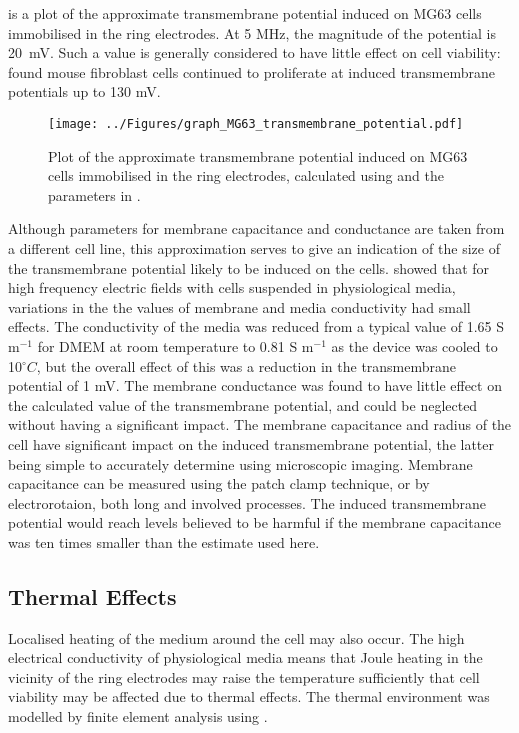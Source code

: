  is a plot of the approximate transmembrane potential induced on MG63 cells immobilised in the ring electrodes. At 5 MHz, the magnitude of the potential is 20~mV. Such a value is generally considered to have little effect on cell viability: \cite{Glasser:1998} found mouse fibroblast cells continued to proliferate at induced transmembrane potentials up to 130 mV.

\begin{figure}
	\centering
		\texttt{[image: ../Figures/graph\_MG63\_transmembrane\_potential.pdf]}
	\caption[Plot of the approximate transmembrane potential induced on MG63 cells immobilised in the ring electrodes.]{Plot of the approximate transmembrane potential induced on MG63 cells immobilised in the ring electrodes, calculated using  and the parameters in .}
	\label{fig:graph_MG63_transmembrane_potential}
\end{figure}

Although parameters for membrane capacitance and conductance are taken from a different cell line, this approximation serves to give an indication of the size of the transmembrane potential likely to be induced on the cells. \cite{Kotnik:1997} showed that for high frequency electric fields with cells suspended in physiological media, variations in the the values of membrane and media conductivity had small effects. The conductivity of the media was reduced from a typical value of 1.65 S m$^{-1}$ for DMEM at room temperature to 0.81 S m$^{-1}$ as the device was cooled to 10$^{\circ}C$, but the overall effect of this was a reduction in the transmembrane potential of 1 mV. The membrane conductance was found to have little effect on the calculated value of the transmembrane potential, and could be neglected without having a significant impact. The membrane capacitance and radius of the cell have significant impact on the induced transmembrane potential, the latter being simple to accurately determine using microscopic imaging. Membrane capacitance can be measured using the patch clamp technique, or by electrorotaion, both long and involved processes. The induced transmembrane potential would reach levels believed to be harmful if the membrane capacitance was ten times smaller than the estimate used here.

\subsection{Thermal Effects}
Localised heating of the medium around the cell may also occur. The high electrical conductivity of physiological media means that Joule heating in the vicinity of the ring electrodes may raise the temperature sufficiently that cell viability may be affected due to thermal effects. The thermal environment was modelled by finite element analysis using .

